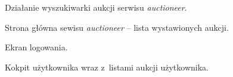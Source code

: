 \begin{figure}[h]
\centering
{}
\caption{Działanie wyszukiwarki aukcji serwisu \textit{auctioneer}.}
\label{screen02}
\end{figure}

\begin{figure}[h]
\centering
{}
\caption{Strona główna sewisu \textit{auctioneer} -- lista wystawionych aukcji.}
\label{screen01}
\end{figure}

\begin{figure}[h]
\centering
{}
\caption{Ekran logowania.}
\label{screen03}
\end{figure}

\begin{figure}[h]
\centering
{}
\caption{Kokpit użytkownika wraz z~listami aukcji użytkownika.}
\label{screen04}
\end{figure}

